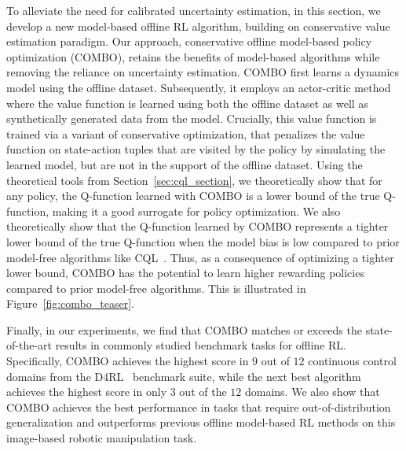 \documentclass[../thesis.tex]{subfiles}
\begin{document}
To alleviate the need for calibrated uncertainty estimation, in this section, we develop a new model-based offline RL algorithm, building on conservative value estimation paradigm. Our approach, conservative offline model-based policy optimization (COMBO), retains the benefits of model-based algorithms while removing the reliance on uncertainty estimation. COMBO first learns a dynamics model using the offline dataset. Subsequently, it employs an actor-critic method where the value function is learned using both the offline dataset as well as synthetically generated data from the model. Crucially, this value function is trained via a variant of conservative optimization, that penalizes the value function on state-action tuples that are visited by the policy by simulating the learned model, but are not in the support of the offline dataset.
Using the theoretical tools from Section~\ref{sec:cql_section}, we theoretically show that for any policy, the Q-function learned with COMBO is a lower bound of the true Q-function, making it a good surrogate for policy optimization. 
We also theoretically show that the Q-function learned by COMBO represents a tighter lower bound of the true Q-function when the model bias is low compared to prior model-free algorithms like CQL~\cite{kumar2020conservative}.
Thus, as a consequence of optimizing a tighter lower bound, COMBO has the potential to learn higher rewarding policies compared to prior model-free algorithms. This is illustrated in Figure~\ref{fig:combo_teaser}.

Finally, in our experiments, we find that COMBO matches or exceeds the state-of-the-art results in commonly studied benchmark tasks for offline RL. Specifically, COMBO achieves the highest score in $9$ out of $12$ continuous control domains from the D4RL~\cite{fu2020d4rl} benchmark suite, while the next best algorithm achieves the highest score in only $3$ out of the $12$ domains. We also show that COMBO achieves the best performance in tasks that require out-of-distribution generalization and outperforms previous offline model-based RL methods on this image-based robotic manipulation task.%




\end{document}
